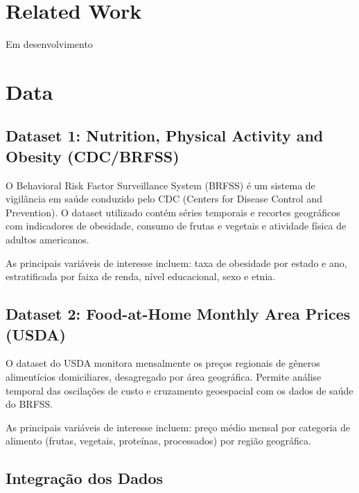 \documentclass[kdmile,a4paper]{kdmile}
\begin{document}
\section{Related Work}
\label{sec:related}

Em desenvolvimento \cite{TODO} 


\section{Data}
\label{sec:data}

\subsection{Dataset 1: Nutrition, Physical Activity and Obesity (CDC/BRFSS)}

O Behavioral Risk Factor Surveillance System (BRFSS) é um sistema de vigilância em saúde
conduzido pelo CDC (Centers for Disease Control and Prevention). O dataset utilizado
contém séries temporais e recortes geográficos com indicadores de obesidade, consumo de
frutas e vegetais e atividade física de adultos americanos.

As principais variáveis de interesse incluem: taxa de obesidade por estado e ano,
estratificada por faixa de renda, nível educacional, sexo e etnia.

\subsection{Dataset 2: Food-at-Home Monthly Area Prices (USDA)}

O dataset do USDA monitora mensalmente os preços regionais de gêneros alimentícios
domiciliares, desagregado por área geográfica. Permite análise temporal das oscilações de
custo e cruzamento geoespacial com os dados de saúde do BRFSS.

As principais variáveis de interesse incluem: preço médio mensal por categoria de alimento
(frutas, vegetais, proteínas, processados) por região geográfica.

\subsection{Integração dos Dados}
\end{document}
